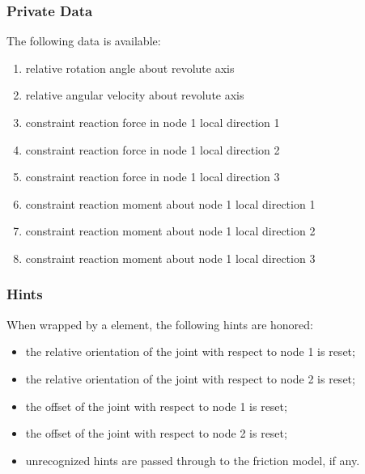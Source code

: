 \subsubsection{Private Data}
The following data is available:
\begin{enumerate}
\item {} relative rotation angle about revolute axis
\item {} relative angular velocity about revolute axis
\item {} constraint reaction force in node 1 local direction 1
\item {} constraint reaction force in node 1 local direction 2
\item {} constraint reaction force in node 1 local direction 3
\item {} constraint reaction moment about node 1 local direction 1
\item {} constraint reaction moment about node 1 local direction 2
\item {} constraint reaction moment about node 1 local direction 3
\end{enumerate}

\subsubsection{Hints}
When wrapped by a  element, the following hints are honored:
\begin{itemize}
\item {} the relative orientation of the joint
with respect to node 1 is reset;
\item {} the relative orientation of the joint
with respect to node 2 is reset;
\item {} the offset of the joint
with respect to node 1 is reset;
\item {} the offset of the joint
with respect to node 2 is reset;
\item unrecognized hints are passed through to the friction model,
if any.
\end{itemize}





